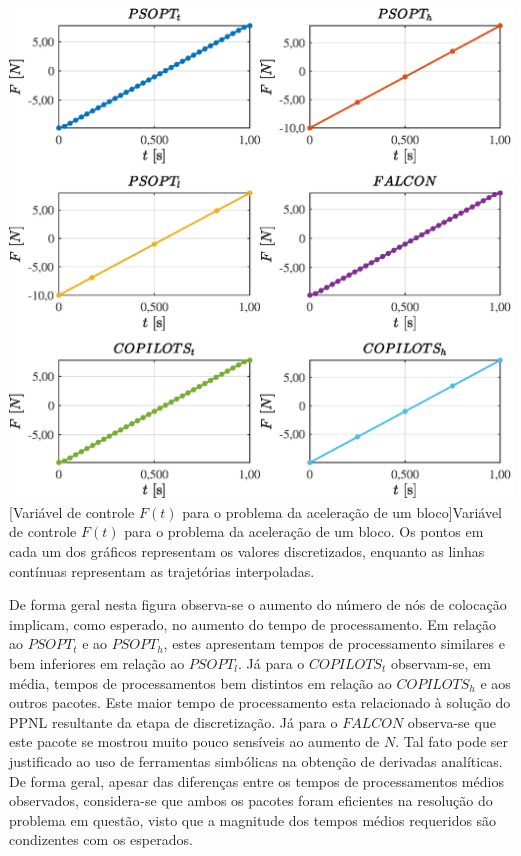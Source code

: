 \noindent
\begin{minipage}{\textwidth}
	\vspace{\onelineskip}
	\centering
	\includegraphics[scale=0.7]{fig/resultados/integrador/traj/u/F}
	[Variável de controle $F(t)$ para o problema da aceleração de um bloco]{Variável de controle $F(t)$ para o problema da aceleração de um bloco. Os pontos em cada um dos gráficos representam os valores discretizados, enquanto as linhas contínuas representam as trajetórias interpoladas.}
	\label{fig:integrador:u:F}
	\vspace{\onelineskip}
\end{minipage}

De forma geral nesta figura observa-se o aumento do número de nós de colocação implicam, como esperado, no aumento do tempo de processamento. Em relação ao $ PSOPT_t $ e ao $ PSOPT_h $, estes apresentam tempos de processamento similares e bem inferiores em relação ao $ PSOPT_l$. Já para o $ COPILOTS_t$ observam-se, em média, tempos de processamentos bem distintos em relação ao $ COPILOTS_h$ e aos outros pacotes. Este maior tempo de processamento esta relacionado à solução do PPNL resultante da etapa de discretização. Já para o $ FALCON $ observa-se que este pacote se mostrou muito pouco sensíveis ao aumento de $ N $. Tal fato pode ser justificado ao uso de ferramentas simbólicas na obtenção de derivadas analíticas. De forma geral, apesar das diferenças entre os tempos de processamentos médios observados, considera-se que ambos os pacotes foram eficientes na resolução do problema em questão, visto que a magnitude dos tempos médios requeridos são condizentes com os esperados.

